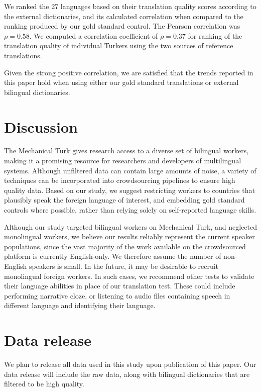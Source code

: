 \documentclass[11pt]{article}
\begin{document}
We ranked the 27 languages based on their translation quality scores according to the external dictionaries, and its calculated correlation when compared to the ranking produced by our gold standard control.  The Pearson correlation was $\rho=0.58$.  We computed a correlation coefficient of $\rho=0.37$ for ranking of the translation quality of individual Turkers using the two sources of reference translations.    

Given the strong positive correlation, we are satisfied that the trends reported in this paper hold when using either our gold standard translations or external bilingual dictionaries. 





\section{Discussion}
The Mechanical Turk gives research access to a diverse set of bilingual workers, making it a promising resource for researchers and developers of multilingual systems. 
Although unfiltered data can contain large amounts of noise, 
a variety of techniques can be incorporated into crowdsourcing pipelines to ensure high quality data.  Based on our study, we suggest restricting workers to countries that plausibly speak the foreign language of interest, and embedding gold standard controls where possible, rather than relying solely on self-reported language skills.

Although our study targeted bilingual workers on Mechanical Turk, and neglected monolingual workers, we believe our results reliably represent the current speaker populations, since the vast majority of the work available on the crowdsourced platform is currently English-only.  We therefore assume the number of non-English speakers is small.  In the future, it may be desirable to recruit monolingual foreign workers.  In such cases, we recommend other tests to validate their language abilities in place of our translation test.  These could include performing narrative cloze, or listening to audio files containing speech in different language and identifying their language. 


\section{Data release}

We plan to release all data used in this study upon publication of this paper.  Our data release will include the raw data, along with bilingual dictionaries that are filtered to be high quality. 



\end{document}
